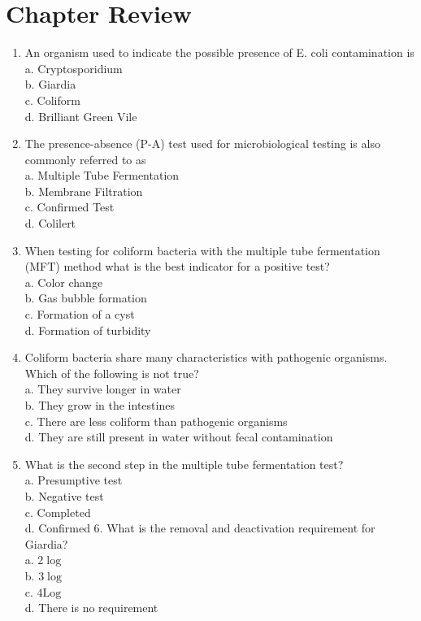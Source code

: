 \documentclass[10pt]{article}
\begin{document}
\section{Chapter Review}
\begin{enumerate}
  \item An organism used to indicate the possible presence of E. coli contamination is\\
a. Cryptosporidium\\
b. Giardia\\
c. Coliform\\
d. Brilliant Green Vile

  \item The presence-absence (P-A) test used for microbiological testing is also commonly referred to as\\
a. Multiple Tube Fermentation\\
b. Membrane Filtration\\
c. Confirmed Test\\
d. Colilert

  \item When testing for coliform bacteria with the multiple tube fermentation (MFT) method what is the best indicator for a positive test?\\
a. Color change\\
b. Gas bubble formation\\
c. Formation of a cyst\\
d. Formation of turbidity

  \item Coliform bacteria share many characteristics with pathogenic organisms. Which of the following is not true?\\
a. They survive longer in water\\
b. They grow in the intestines\\
c. There are less coliform than pathogenic organisms\\
d. They are still present in water without fecal contamination

  \item What is the second step in the multiple tube fermentation test?\\
a. Presumptive test\\
b. Negative test\\
c. Completed\\
d. Confirmed 6. What is the removal and deactivation requirement for Giardia?\\
a. $2 \log$\\
b. $3 \log$\\
c. $4 \mathrm{Log}$\\
d. There is no requirement


\end{enumerate}
\end{document}

